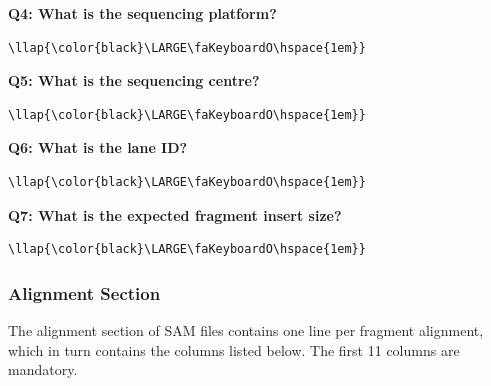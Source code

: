 \documentclass[11pt]{article}
\begin{document}
\newpage




    \textbf{Q4: What is the sequencing platform?}

\begin{terminalinput}
\begin{Verbatim}[commandchars=\\\{\}]
\llap{\color{black}\LARGE\faKeyboardO\hspace{1em}}
\end{Verbatim}
\end{terminalinput}

    \textbf{Q5: What is the sequencing centre?}

\begin{terminalinput}
\begin{Verbatim}[commandchars=\\\{\}]
\llap{\color{black}\LARGE\faKeyboardO\hspace{1em}}
\end{Verbatim}
\end{terminalinput}

    \textbf{Q6: What is the lane ID?}

\begin{terminalinput}
\begin{Verbatim}[commandchars=\\\{\}]
\llap{\color{black}\LARGE\faKeyboardO\hspace{1em}}
\end{Verbatim}
\end{terminalinput}

    \textbf{Q7: What is the expected fragment insert size?}

\begin{terminalinput}
\begin{Verbatim}[commandchars=\\\{\}]
\llap{\color{black}\LARGE\faKeyboardO\hspace{1em}}
\end{Verbatim}
\end{terminalinput}

    \hypertarget{alignment-section}{%
\subsubsection{Alignment Section}\label{alignment-section}}

The alignment section of SAM files contains one line per fragment
alignment, which in turn contains the columns listed below. The first 11
columns are mandatory.
\end{document}
